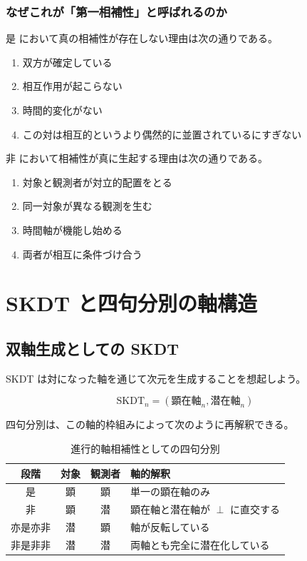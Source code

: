 \documentclass[12pt,a4paper]{article}
\theoremstyle{definition}
\begin{document}
\subsubsection{なぜこれが「第一相補性」と呼ばれるのか}

是 において真の相補性が存在しない理由は次の通りである。

\begin{enumerate}
    \item 双方が確定している
    \item 相互作用が起こらない
    \item 時間的変化がない
    \item この対は相互的というより偶然的に並置されているにすぎない
\end{enumerate}

非 において相補性が真に生起する理由は次の通りである。

\begin{enumerate}
    \item 対象と観測者が対立的配置をとる
    \item 同一対象が異なる観測を生む
    \item 時間軸が機能し始める
    \item 両者が相互に条件づけ合う
\end{enumerate}

\section{SKDT と四句分別の軸構造}

\subsection{双軸生成としての SKDT}

SKDT は対になった軸を通じて次元を生成することを想起しよう。

\begin{equation}
\text{SKDT}_n = (\text{顕在軸}_n, \text{潜在軸}_n)
\end{equation}

四句分別は、この軸的枠組みによって次のように再解釈できる。

\begin{table}[htbp]
\centering
\begin{tabularx}{\textwidth}{|c|c|c|>{\raggedright\arraybackslash}X|}
\hline
\textbf{段階} & \textbf{対象} & \textbf{観測者} & \textbf{軸的解釈} \\
\hline
是 & 顕 & 顕 & 単一の顕在軸のみ \\
\hline
非 & 顕 & 潜 & 顕在軸と潜在軸が $\perp$ に直交する \\
\hline
亦是亦非 & 潜 & 顕 & 軸が反転している \\
\hline
非是非非 & 潜 & 潜 & 両軸とも完全に潜在化している \\
\hline
\end{tabularx}
\caption{進行的軸相補性としての四句分別}
\end{table}
\end{document}
